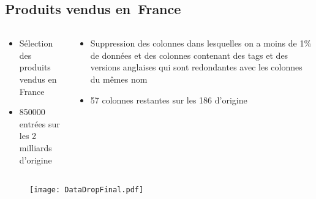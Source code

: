 \subsection{Produits vendus en France}
\begin{frame}{\insertsubsection}
  \begin{columns}[T]
    \begin{column}{.4\textwidth}
      \begin{itemize}
        \item Sélection des produits vendus en France
        \item \num{850000} entrées sur les 2 milliards d'origine
      \end{itemize}
    \end{column}
    \begin{column}{.6\textwidth}
      \begin{itemize}
        \item Suppression des colonnes dans lesquelles on a moins de 1\% de données
              et des colonnes contenant des tags et des versions anglaises qui sont redondantes avec les
              colonnes du mêmes nom
        \item 57 colonnes restantes sur les 186 d'origine
      \end{itemize}
    \end{column}
  \end{columns}
  \vfill
  \begin{figure}
    \texttt{[image: DataDropFinal.pdf]}
  \end{figure}
\end{frame}

